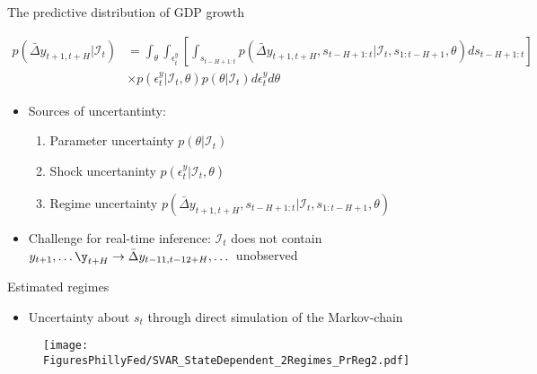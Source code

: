 \documentclass[xcolor=dvipsnames, xcolor=table, 10pt]{beamer}
\begin{document}
\begin{frame}{The predictive distribution of GDP growth}
\vspace*{-0.5in}

\begin{align*}
p\left(\bar{\Delta} y_{t+1,t+H}|\mathcal{I}_t\right) &= \int_\theta \int_{\epsilon^y_t} \left[ \int_{s_{t-H+1:t}} p(\bar{\Delta} y_{t+1,t+H}, s_{t-H+1:t} | \mathcal{I}_t, s_{1:t-H+1},\theta) ds_{t-H+1:t} \right] \\ &  \times p(\epsilon^y_t|\mathcal{I}_t,\theta) p(\theta|\mathcal{I}_t) d \epsilon^y_t  d \theta
\end{align*}

\begin{itemize}
\item Sources of uncertantinty:
  \begin{enumerate}
    \medskip
    \item Parameter uncertainty $p(\theta|\mathcal{I}_t)$
    \medskip
    \item Shock uncertaninty $p(\epsilon^y_t|\mathcal{I}_t,\theta)$
    \medskip
    \item Regime uncertainty $p(\bar{\Delta} y_{t+1,t+H}, s_{t-H+1:t} | \mathcal{I}_t, s_{1:t-H+1},\theta)$
  \end{enumerate}
\bigskip
\item Challenge for real-time inference: $\mathcal{I}_t$ does not contain $y_{t+1},\dots \y_{t+H} \rightarrow \bar{\Delta} y_{t-11,t-12+H}, \dots $ unobserved
\end{itemize}

\end{frame}



\begin{frame}{Estimated regimes}
\medskip
\begin{itemize}
\item Uncertainty about $s_t$ through direct simulation of the Markov-chain
\end{itemize}

\vspace*{-0.25cm}
\begin{figure}
     \texttt{[image: FiguresPhillyFed/SVAR\_StateDependent\_2Regimes\_PrReg2.pdf]}
\end{figure}

\end{frame}
\end{document}
